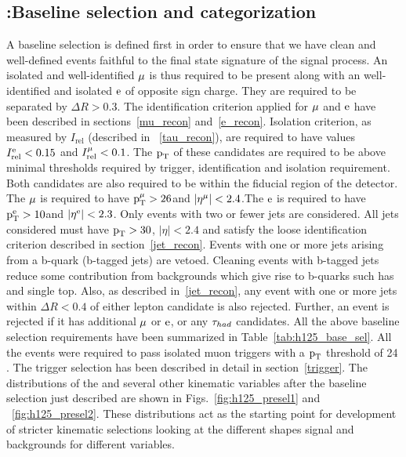 \subsection{\hmue:Baseline selection and categorization}
\label{h125_presel_cat}
A baseline selection is defined first in order to ensure that we have clean and well-defined events faithful to the final state signature of the signal process. An isolated and well-identified $\mu$ is thus required to be present along with an well-identified and isolated $\text{e}$ of opposite sign charge. They are required to be separated by $\Delta R > 0.3$. The identification criterion applied for $\mu$ and $\text{e}$ have been described in sections~\ref{mu_recon} and~\ref{e_recon}. Isolation criterion, as measured by $I_\text{rel}$ (described in ~\ref{tau_recon}), are required to have values $I_\text{rel}^{\text{e}} < 0.15$ and $I_\text{rel}^{\mu} < 0.1$. The $\text{p}_\text{T}$ of these candidates are required to be above minimal thresholds required by trigger, identification and isolation requirement. Both candidates are also required to be within the fiducial region of the detector. The $\mu$ is required to have $\text{p}_\text{T}^{\mu} > 26$\GeV and $|\eta^{\mu}|<2.4$.The $\text{e}$ is required to have $\text{p}_\text{T}^{\text{e}} > 10$\GeV and $|\eta^{\text{e}}|<2.3$. Only events with two or fewer jets are considered. All jets considered must have $\text{p}_\text{T}>30$\GeV, $|\eta| < 2.4 $ and satisfy the loose identification criterion described in section~\ref{jet_recon}. Events with one or more jets arising from a b-quark (b-tagged jets) are vetoed. Cleaning events with b-tagged jets reduce some contribution from backgrounds which give rise to b-quarks such has \ttb and single top. Also, as described in~\ref{jet_recon}, any event with one or more jets within $\Delta R < 0.4$ of either lepton candidate is also rejected. Further, an event is rejected if it has additional $\mu$ or $\text{e}$, or any $\tau_{had}$ candidates. All the above baseline selection requirements have been summarized in Table~\ref{tab:h125_base_sel}. All the events were required to pass isolated muon triggers with a $\text{p}_\text{T}$ threshold of 24 \GeV. The trigger selection has been described in detail in section~\ref{trigger}. The distributions of the \mcol and several other kinematic variables after the baseline selection just described are shown in Figs.~\ref{fig:h125_presel1} and ~\ref{fig:h125_presel2}. These distributions act as the starting point for development of stricter kinematic selections looking at the different shapes signal and backgrounds for different variables.     


